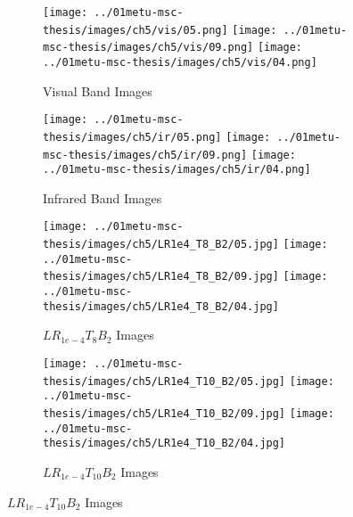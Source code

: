 \begin{figure}[htbp]
    \centering
    \begin{subfigure}[b]{\textwidth}
        \texttt{[image: ../01metu-msc-thesis/images/ch5/vis/05.png]}
        \texttt{[image: ../01metu-msc-thesis/images/ch5/vis/09.png]}
        \texttt{[image: ../01metu-msc-thesis/images/ch5/vis/04.png]}
        \caption{Visual Band Images}
    \end{subfigure}
    \vspace{0.01cm}
    \begin{subfigure}[b]{\textwidth}
        \texttt{[image: ../01metu-msc-thesis/images/ch5/ir/05.png]}
        \texttt{[image: ../01metu-msc-thesis/images/ch5/ir/09.png]}
        \texttt{[image: ../01metu-msc-thesis/images/ch5/ir/04.png]}
        \caption{Infrared Band Images}
    \end{subfigure}
    \vspace{0.01cm}
    \begin{subfigure}[b]{\textwidth}
        \texttt{[image: ../01metu-msc-thesis/images/ch5/LR1e4\_T8\_B2/05.jpg]}
        \texttt{[image: ../01metu-msc-thesis/images/ch5/LR1e4\_T8\_B2/09.jpg]}
        \texttt{[image: ../01metu-msc-thesis/images/ch5/LR1e4\_T8\_B2/04.jpg]}
        \caption{$LR_{1e-4}T_{8}B_{2}$ Images}
    \end{subfigure}
    \vspace{0.01cm}
    \begin{subfigure}[b]{\textwidth}
        \texttt{[image: ../01metu-msc-thesis/images/ch5/LR1e4\_T10\_B2/05.jpg]}
        \texttt{[image: ../01metu-msc-thesis/images/ch5/LR1e4\_T10\_B2/09.jpg]}
        \texttt{[image: ../01metu-msc-thesis/images/ch5/LR1e4\_T10\_B2/04.jpg]}
        \caption{$LR_{1e-4}T_{10}B_{2}$ Images}
    \end{subfigure}

\end{figure}
